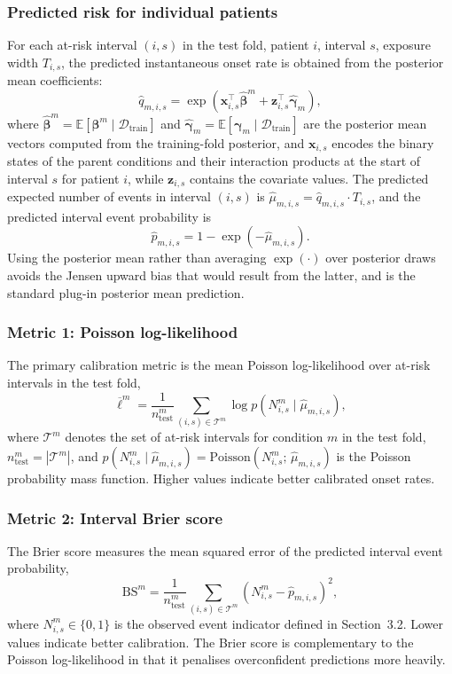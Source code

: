 \documentclass[12pt]{article}
\begin{document}
\subsubsection{Predicted risk for individual patients} For each at-risk interval $(i, s)$ in the test fold, patient $i$, interval $s$, exposure width $T_{i,s}$, the predicted instantaneous onset rate is obtained from the posterior mean coefficients:
\[
\hat{q}_{m,i,s} = \exp\!\left(\mathbf{x}_{i,s}^\top \hat{\boldsymbol{\beta}}^m + \mathbf{z}_{i,s}^\top \hat{\boldsymbol{\gamma}}_m\right),
\]
where $\hat{\boldsymbol{\beta}}^m = \mathbb{E}[\boldsymbol{\beta}^m \mid \mathcal{D}_{\mathrm{train}}]$ and $\hat{\boldsymbol{\gamma}}_m = \mathbb{E}[\boldsymbol{\gamma}_m \mid \mathcal{D}_{\mathrm{train}}]$ are the posterior mean vectors computed from the training-fold posterior, and $\mathbf{x}_{i,s}$ encodes the binary states of the parent conditions and their interaction products at the start of interval $s$ for patient $i$, while $\mathbf{z}_{i,s}$ contains the covariate values. The predicted expected number of events in interval $(i,s)$ is $\hat{\mu}_{m,i,s} = \hat{q}_{m,i,s} \cdot T_{i,s}$, and the predicted interval event probability is
\[
\hat{p}_{m,i,s} = 1 - \exp(-\hat{\mu}_{m,i,s}).
\]
Using the posterior mean rather than averaging $\exp(\cdot)$ over posterior draws avoids the Jensen upward bias that would result from the latter, and is the standard plug-in posterior mean prediction.

\subsubsection{Metric 1: Poisson log-likelihood} The primary calibration metric is the mean Poisson log-likelihood over at-risk intervals in the test fold,
\[
\overline{\ell}^m = \frac{1}{n^m_{\mathrm{test}}} \sum_{(i,s) \in \mathcal{T}^m} \log p\!\left(N^m_{i,s} \mid \hat{\mu}_{m,i,s}\right),
\]
where $\mathcal{T}^m$ denotes the set of at-risk intervals for condition $m$ in the test fold, $n^m_{\mathrm{test}} = |\mathcal{T}^m|$, and $p(N^m_{i,s} \mid \hat{\mu}_{m,i,s}) = \mathrm{Poisson}(N^m_{i,s};\, \hat{\mu}_{m,i,s})$ is the Poisson probability mass function. Higher values indicate better calibrated onset rates.

\subsubsection{Metric 2: Interval Brier score} The Brier score measures the mean squared error of the predicted interval event probability,
\[
\mathrm{BS}^m = \frac{1}{n^m_{\mathrm{test}}} \sum_{(i,s) \in \mathcal{T}^m} \left(N^m_{i,s} - \hat{p}_{m,i,s}\right)^2,
\]
where $N^m_{i,s} \in \{0,1\}$ is the observed event indicator defined in Section~3.2. Lower values indicate better calibration. The Brier score is complementary to the Poisson log-likelihood in that it penalises overconfident predictions more heavily.
\end{document}
